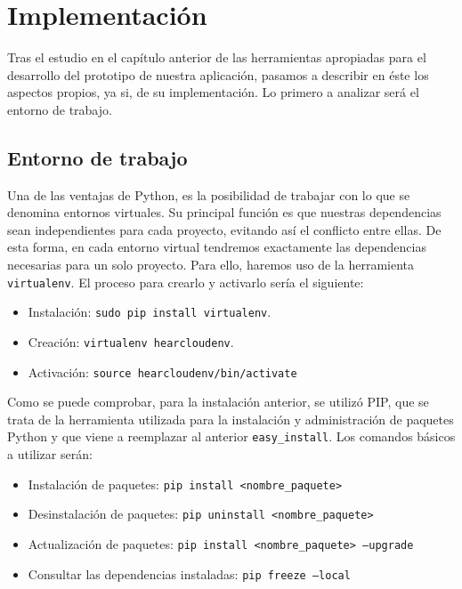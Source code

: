 \chapter{Implementación}
\label{cap:implementacion}

Tras el estudio en el capítulo anterior de las herramientas apropiadas para el desarrollo del prototipo de nuestra aplicación, pasamos a describir en éste los aspectos propios, ya si, de su implementación. Lo primero a analizar será el entorno de trabajo.

\section{Entorno de trabajo}
Una de las ventajas de Python, es la posibilidad de trabajar con lo que se denomina entornos virtuales. Su principal función es que nuestras dependencias sean independientes para cada proyecto, evitando así el conflicto entre ellas. De esta forma, en cada entorno virtual tendremos exactamente las dependencias necesarias para un solo proyecto. Para ello, haremos uso de la herramienta \texttt{virtualenv}. El proceso para crearlo y activarlo sería el siguiente:

\begin{itemize}
	\item Instalación: \texttt{sudo pip install virtualenv}.
	\item Creación: \texttt{virtualenv hearcloudenv}.
	\item Activación: \texttt{source hearcloudenv/bin/activate}
\end{itemize}

Como se puede comprobar, para la instalación anterior, se utilizó PIP, que se trata de la herramienta utilizada para la instalación y administración de paquetes Python y que viene a reemplazar al anterior \texttt{easy\_install}. Los comandos básicos a utilizar serán:

\begin{itemize}
	\item Instalación de paquetes: \texttt{pip install <nombre\_paquete>}
	\item Desinstalación de paquetes: \texttt{pip uninstall <nombre\_paquete>}
	\item Actualización de paquetes: \texttt{pip install <nombre\_paquete> --upgrade}
	\item Consultar las dependencias instaladas: \texttt{pip freeze --local}
\end{itemize}

